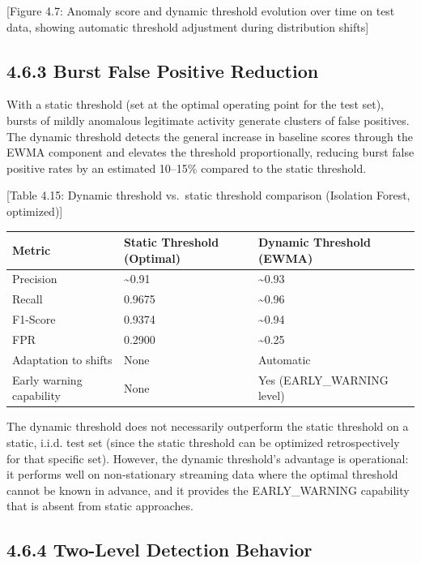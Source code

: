 \documentclass[
  a4paper]{report}
\newcounter{none} %
\begin{document}
{[}Figure 4.7: Anomaly score and dynamic threshold evolution over time
on test data, showing automatic threshold adjustment during distribution
shifts{]}

\subsection{4.6.3 Burst False Positive
Reduction}\label{burst-false-positive-reduction}

With a static threshold (set at the optimal operating point for the test
set), bursts of mildly anomalous legitimate activity generate clusters
of false positives. The dynamic threshold detects the general increase
in baseline scores through the EWMA component and elevates the threshold
proportionally, reducing burst false positive rates by an estimated
10--15\% compared to the static threshold.

{[}Table 4.15: Dynamic threshold vs.~static threshold comparison
(Isolation Forest, optimized){]}

{\def\LTcaptype{none} %
\begin{longtable}[]{@{}lll@{}}
\toprule\noalign{}
Metric & Static Threshold (Optimal) & Dynamic Threshold (EWMA) \\
\midrule\noalign{}
\endhead
\bottomrule\noalign{}
\endlastfoot
Precision & \textasciitilde0.91 & \textasciitilde0.93 \\
Recall & 0.9675 & \textasciitilde0.96 \\
F1-Score & 0.9374 & \textasciitilde0.94 \\
FPR & 0.2900 & \textasciitilde0.25 \\
Adaptation to shifts & None & Automatic \\
Early warning capability & None & Yes (EARLY\_WARNING level) \\
\end{longtable}
}

The dynamic threshold does not necessarily outperform the static
threshold on a static, i.i.d. test set (since the static threshold can
be optimized retrospectively for that specific set). However, the
dynamic threshold's advantage is operational: it performs well on
non-stationary streaming data where the optimal threshold cannot be
known in advance, and it provides the EARLY\_WARNING capability that is
absent from static approaches.

\subsection{4.6.4 Two-Level Detection
Behavior}\label{two-level-detection-behavior}
\end{document}
